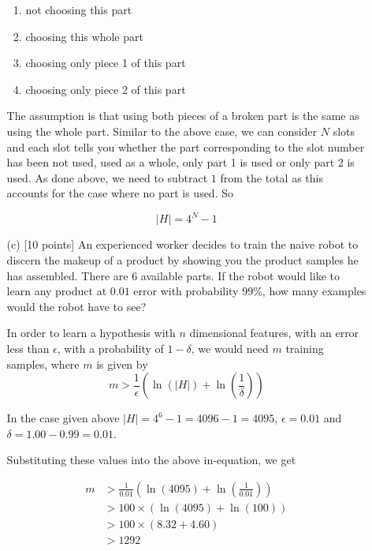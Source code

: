 \begin{enumerate}
\begin{itemize}
\begin{enumerate}

\item not choosing this part
\item choosing this whole part 
\item choosing only piece 1 of this part
\item choosing only piece 2 of this part

\end{enumerate}

The assumption is that using both pieces of a broken part is the same as using the whole part. Similar to the above case, we can consider $N$ slots and each slot tells you whether the part corresponding to the slot number has been not used, used as a whole, only part 1 is used or only part 2 is used. As done above, we need to subtract $1$ from the total as this accounts for the case where no part is used. So

$$
\left | H \right | = 4^N - 1
$$

\item[(c)] [10 points] An experienced worker decides to train the
  naive robot to discern the makeup of a product by showing you the
  product samples he has assembled. There are 6 available parts. If
  the robot would like to learn any product at $0.01$ error with
  probability $99\%$, how many examples would the robot have to see?
  
In order to learn a hypothesis with $n$ dimensional features, with an error less than $\epsilon$, with a probability of $1-\delta$, we would need $m$ training samples, where $m$ is given by
$$  
m > \frac{1}{\epsilon} \left ( \ln(\left | H \right |) + \ln \left ( \frac{1}{\delta} \right ) \right )
$$

In the case given above $\left | H \right | = 4^6 -1 = 4096-1=4095$, $\epsilon=0.01$ and $\delta=1.00- 0.99=0.01$.

Substituting these values into the above in-equation, we get

\begin{equation*}
\begin{aligned}
m &> \frac{1}{0.01} \left ( \ln(4095) + \ln \left ( \frac{1}{0.01} \right ) \right )\\
&> 100 \times \left ( \ln(4095) + \ln (100) \right )\\
&> 100 \times \left ( 8.32 + 4.60 \right )\\
&>1292
\end{aligned}
\end{equation*}


\end{itemize}
\end{enumerate}
